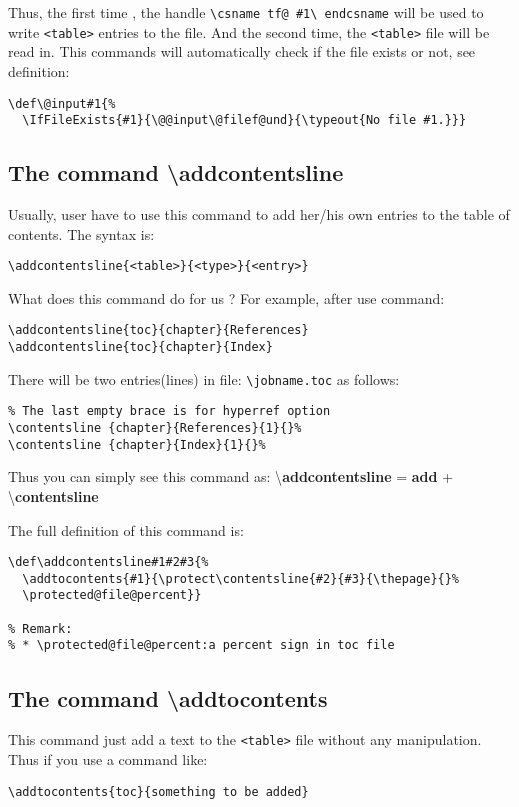\documentclass{article}
\begin{document}
Thus, the first time , the handle \verb|\csname tf@ #1\ endcsname| will be used to write \verb|<table>| entries to the file.
And the second time, the \verb|<table>| file will be read in. This commands will automatically check if the file exists or not,
see definition:
\begin{lstlisting}
\def\@input#1{%
  \IfFileExists{#1}{\@@input\@filef@und}{\typeout{No file #1.}}}
\end{lstlisting}


\subsection{The command \textbackslash addcontentsline}
Usually, user have to use this command to add her/his own entries to the table of contents. The syntax is:
\begin{lstlisting}
\addcontentsline{<table>}{<type>}{<entry>}
\end{lstlisting}

What does this command do for us ? For example, after use command:
\begin{lstlisting}
\addcontentsline{toc}{chapter}{References}
\addcontentsline{toc}{chapter}{Index}
\end{lstlisting}

There will be two entries(lines) in file: \verb|\jobname.toc| as follows:
\begin{lstlisting}
% The last empty brace is for hyperref option
\contentsline {chapter}{References}{1}{}%
\contentsline {chapter}{Index}{1}{}%
\end{lstlisting}

Thus you can simply see this command as: \textbackslash\textbf{addcontentsline} = \textbf{add} + \textbackslash\textbf{contentsline}

The full definition of this command is:
\begin{lstlisting}
\def\addcontentsline#1#2#3{%
  \addtocontents{#1}{\protect\contentsline{#2}{#3}{\thepage}{}%
  \protected@file@percent}}

% Remark: 
% * \protected@file@percent:a percent sign in toc file
\end{lstlisting}


\subsection{The command \textbackslash addtocontents}
This command just add a text to the \verb|<table>| file without any manipulation. Thus if you use a command like:
\begin{lstlisting}
\addtocontents{toc}{something to be added}
\end{lstlisting}
\end{document}
